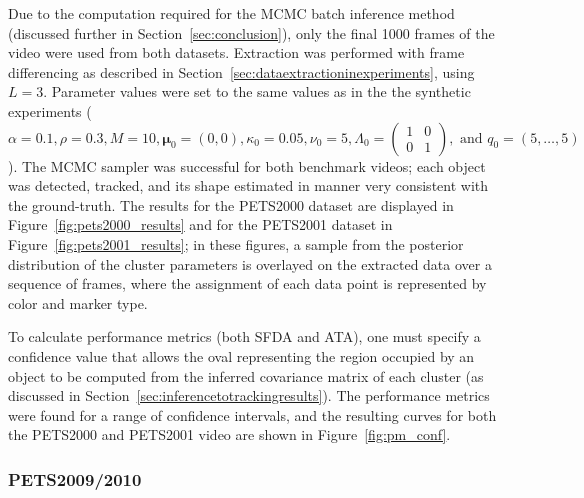 \documentclass[twocolumn, final]{svjour3}
\begin{document}
Due to the computation required for the MCMC batch inference method (discussed further in Section~\ref{sec:conclusion}), only the final 1000 frames of the video were used from both datasets. Extraction was performed with frame differencing as described in Section~\ref{sec:dataextractioninexperiments}, using $L=3$. Parameter values were set to the same values as in the the synthetic experiments ($\alpha = 0.1, \rho = 0.3, M = 10, \boldsymbol{\mu}_{0} = (0,0), \kappa_{0} = 0.05, \nu_{0} = 5, \Lambda_{0} = \left( \begin{smallmatrix} 1&0\\ 0&1 \end{smallmatrix} \right), \text{ and } q_{0} = (5, \ldots, 5)$). The MCMC sampler was successful for both benchmark videos; each object was detected, tracked, and its shape estimated in manner very consistent with the ground-truth. The results for the PETS2000 dataset are displayed in Figure~\ref{fig:pets2000_results} and for the PETS2001 dataset in Figure~\ref{fig:pets2001_results}; in these figures, a sample from the posterior distribution of the cluster parameters is overlayed on the extracted data over a sequence of frames, where the assignment of each data point is represented by color and marker type.


To calculate performance metrics (both SFDA and ATA), one must specify a confidence value that allows the oval representing the region occupied by an object to be computed from the inferred covariance matrix of each cluster (as discussed in Section~\ref{sec:inferencetotrackingresults}). The performance metrics were found for a range of confidence intervals, and the resulting curves for both the PETS2000 and PETS2001 video are shown in Figure~\ref{fig:pm_conf}.



\subsubsection{PETS2009/2010}
\label{sec:pets20092010}
\end{document}
